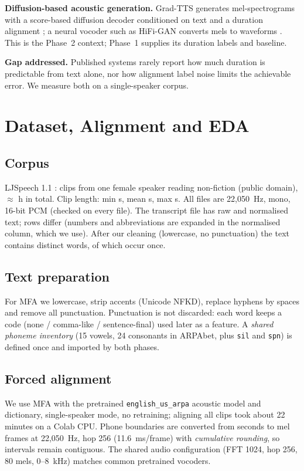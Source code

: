 \documentclass[conference]{IEEEtran}
\begin{document}
\textbf{Diffusion-based acoustic generation.}
Grad-TTS generates mel-spectrograms with a score-based diffusion decoder conditioned on text and a duration alignment \cite{popov2021}; a neural vocoder such as HiFi-GAN converts mels to waveforms \cite{kong2020}.
This is the Phase~2 context; Phase~1 supplies its duration labels and baseline.

\textbf{Gap addressed.}
Published systems rarely report how much duration is predictable from text alone, nor how alignment label noise limits the achievable error.
We measure both on a single-speaker corpus.

\section{Dataset, Alignment and EDA}\label{sec:data}
\subsection{Corpus}
LJSpeech 1.1 \cite{ljspeech2017}: \nClips{} clips from one female speaker reading non-fiction (public domain), $\approx$\totalHours{} h in total.
Clip length: min \minDur{} s, mean \meanDur{} s, max \maxDur{} s. All files are 22{,}050~Hz, mono, 16-bit PCM (checked on every file).
The transcript file has raw and normalised text; \nRawNeqNorm{} rows differ (numbers and abbreviations are expanded in the normalised column, which we use).
After our cleaning (lowercase, no punctuation) the text contains \vocabSize{} distinct words, of which \nSingletons{} occur once.

\subsection{Text preparation}
For MFA we lowercase, strip accents (Unicode NFKD), replace hyphens by spaces and remove all punctuation. Punctuation is not discarded: each word keeps a code (none / comma-like / sentence-final) used later as a feature.
A \emph{shared phoneme inventory} (15 vowels, 24 consonants in ARPAbet, plus \texttt{sil} and \texttt{spn}) is defined once and imported by both phases.

\subsection{Forced alignment}
We use MFA \mfaVersion{} with the pretrained \texttt{english\_us\_arpa} acoustic model and dictionary, single-speaker mode, no retraining; aligning all \nClips{} clips took about 22 minutes on a Colab CPU.
Phone boundaries are converted from seconds to mel frames at 22{,}050~Hz, hop 256 (11.6~ms/frame) with \emph{cumulative rounding}, so intervals remain contiguous. The shared audio configuration (FFT 1024, hop 256, 80 mels, 0--8~kHz) matches common pretrained vocoders.
\end{document}
